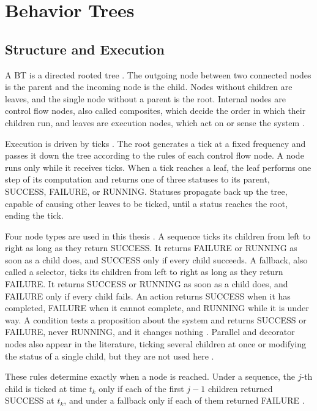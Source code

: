 \section{Behavior Trees}
\label{sec:background_bt}
    \subsection{Structure and Execution}
    \label{subsec:bt_structure}
    A BT is a directed rooted tree \cite{colledanchise2018book, marzinotto2014}.
    The outgoing node between two connected nodes is the parent and the incoming node is the child.
    Nodes without children are leaves, and the single node without a parent is the root.
    Internal nodes are control flow nodes, also called composites, which decide the order in which their children run, and leaves are execution nodes, which act on or sense the system \cite{colledanchise2018book}.

    Execution is driven by ticks \cite{marzinotto2014}.
    The root generates a tick at a fixed frequency and passes it down the tree according to the rules of each control flow node.
    A node runs only while it receives ticks.
    When a tick reaches a leaf, the leaf performs one step of its computation and returns one of three statuses to its parent, SUCCESS, FAILURE, or RUNNING.
    Statuses propagate back up the tree, capable of causing other leaves to be ticked, until a status reaches the root, ending the tick.
    
    Four node types are used in this thesis \cite{colledanchise2018book}.
    A sequence ticks its children from left to right as long as they return SUCCESS.
    It returns FAILURE or RUNNING as soon as a child does, and SUCCESS only if every child succeeds.
    A fallback, also called a selector, ticks its children from left to right as long as they return FAILURE.
    It returns SUCCESS or RUNNING as soon as a child does, and FAILURE only if every child fails.
    An action returns SUCCESS when it has completed, FAILURE when it cannot complete, and RUNNING while it is under way.
    A condition tests a proposition about the system and returns SUCCESS or FAILURE, never RUNNING, and it changes nothing \cite{ogren2012}.
    Parallel and decorator nodes also appear in the literature, ticking several children at once or modifying the status of a single child, but they are not used here \cite{colledanchise2018book, marzinotto2014}.
    
    These rules determine exactly when a node is reached.
    Under a sequence, the $j$-th child is ticked at time $t_k$ only if each of the first $j-1$ children returned SUCCESS at $t_k$, and under a fallback only if each of them returned FAILURE \cite{marzinotto2014}.

